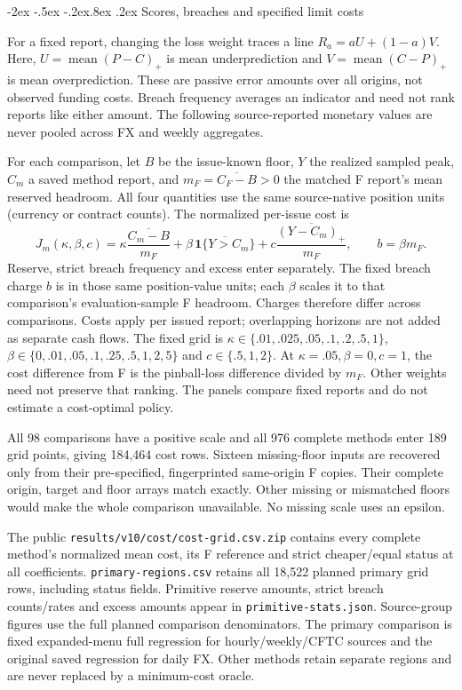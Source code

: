 \documentclass[10pt,a4paper]{article}
\makeatletter
\renewcommand\section{\@startsection{section}{1}{\z@}%
  {-2ex \@plus -.5ex \@minus -.2ex}{.8ex \@plus .2ex}%
  {\normalfont\large\bfseries}}
\makeatother
\begin{document}
\FloatBarrier


\section{Scores, breaches and specified limit costs}\label{sup:preference}\label{sup:frontier-0}\label{sup:wp3-murphy}\label{sup:v10-cost}\label{sup:v10-diagnostics}

For a fixed report, changing the loss weight traces a line
\(R_a=aU+(1-a)V\). Here, \(U=\operatorname{mean}(P-C)_+\) is mean underprediction and
\(V=\operatorname{mean}(C-P)_+\) is mean overprediction. These are passive error amounts over all
origins, not observed funding costs. Breach frequency averages an indicator and
need not rank reports like either amount. The following source-reported monetary
values are never pooled across FX and weekly aggregates.

For each comparison, let $B$ be the issue-known floor, $Y$ the realized sampled peak,
$C_m$ a saved method report, and $m_F=\overline{C_F-B}>0$ the matched F report's
mean reserved headroom. All four quantities use the same source-native position
units (currency or contract counts). The normalized per-issue cost is
\[
J_m(\kappa,\beta,c)=\kappa\frac{\overline{C_m-B}}{m_F}
+\beta\,\overline{\mathbf 1\{Y>C_m\}}
+c\frac{\overline{(Y-C_m)_+}}{m_F},\qquad b=\beta m_F.
\]
Reserve, strict breach frequency and excess enter separately. The fixed breach
charge $b$ is in those same position-value units; each $\beta$ scales it to that
comparison's evaluation-sample F headroom. Charges therefore differ across
comparisons. Costs apply per issued report; overlapping horizons are not
added as separate cash flows.
The fixed grid is $\kappa\in\{.01,.025,.05,.1,.2,.5,1\}$,
$\beta\in\{0,.01,.05,.1,.25,.5,1,2,5\}$ and $c\in\{.5,1,2\}$.
At $\kappa=.05,\beta=0,c=1$, the cost difference from F is the pinball-loss
difference divided by $m_F$. Other weights need not preserve that ranking.
The panels compare fixed reports and do not estimate a cost-optimal policy.

All 98 comparisons have a positive scale and all 976 complete methods enter 189 grid points, giving 184,464 cost rows. Sixteen missing-floor inputs are recovered only from their pre-specified, fingerprinted same-origin F copies. Their complete origin, target and floor arrays match exactly. Other missing or mismatched floors would make the whole comparison unavailable. No missing scale uses an epsilon.

The public \texttt{results/v10/cost/cost-grid.csv.zip} contains every complete method's normalized mean cost, its F reference and strict cheaper/equal status at all coefficients. \texttt{primary-regions.csv} retains all 18,522 planned primary grid rows, including status fields. Primitive reserve amounts, strict breach counts/rates and excess amounts appear in \texttt{primitive-stats.json}. Source-group figures use the full planned comparison denominators. The primary comparison is fixed expanded-menu full regression for hourly/weekly/CFTC sources and the original saved regression for daily FX. Other methods retain separate regions and are never replaced by a minimum-cost oracle.
\end{document}
